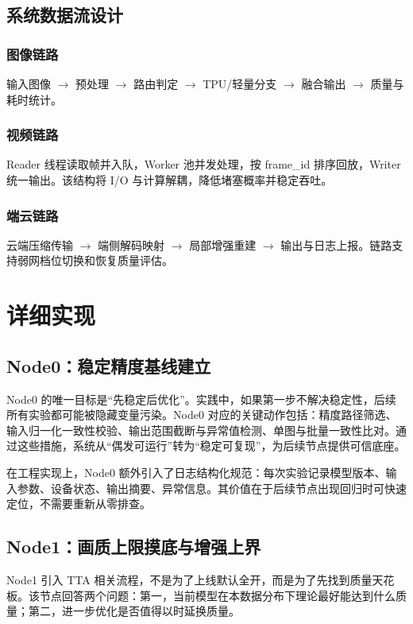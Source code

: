 \documentclass[12pt,a4paper]{ctexart}
\begin{document}
\subsection{系统数据流设计}

\subsubsection{图像链路}
输入图像 $\rightarrow$ 预处理 $\rightarrow$ 路由判定 $\rightarrow$ TPU/轻量分支 $\rightarrow$ 融合输出 $\rightarrow$ 质量与耗时统计。

\subsubsection{视频链路}
Reader 线程读取帧并入队，Worker 池并发处理，按 frame\_id 排序回放，Writer 统一输出。该结构将 I/O 与计算解耦，降低堵塞概率并稳定吞吐。

\subsubsection{端云链路}
云端压缩传输 $\rightarrow$ 端侧解码映射 $\rightarrow$ 局部增强重建 $\rightarrow$ 输出与日志上报。链路支持弱网档位切换和恢复质量评估。

\section{详细实现}

\subsection{Node0：稳定精度基线建立}

Node0 的唯一目标是“先稳定后优化”。实践中，如果第一步不解决稳定性，后续所有实验都可能被隐藏变量污染。Node0 对应的关键动作包括：精度路径筛选、输入归一化一致性校验、输出范围截断与异常值检测、单图与批量一致性比对。通过这些措施，系统从“偶发可运行”转为“稳定可复现”，为后续节点提供可信底座。

在工程实现上，Node0 额外引入了日志结构化规范：每次实验记录模型版本、输入参数、设备状态、输出摘要、异常信息。其价值在于后续节点出现回归时可快速定位，不需要重新从零排查。

\subsection{Node1：画质上限摸底与增强上界}

Node1 引入 TTA 相关流程，不是为了上线默认全开，而是为了先找到质量天花板。该节点回答两个问题：第一，当前模型在本数据分布下理论最好能达到什么质量；第二，进一步优化是否值得以时延换质量。
\end{document}
